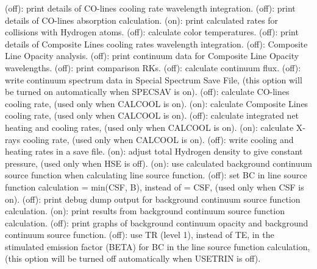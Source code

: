 \space \vbox { (off): \bang
print details of CO-lines cooling rate wavelength integration.}
\space \vbox { (off): \bang
print details of CO-lines absorption calculation.}
\space \vbox { (on): \bang
print calculated rates for collisions with Hydrogen atoms.}
\space \vbox { (off): \bang
calculate color temperatures.}
\space \vbox { (off): \bang
print details of Composite Lines cooling rates wavelength integration.}
\space \vbox { (off): \bang
Composite Line Opacity analysis.}
\space \vbox { (off): \bang
print continuum data for Composite Line Opacity wavelengths.}
\space \vbox { (off): \bang
print comparison RKs.}
\space \vbox { (off): \bang
calculate continuum flux.}
\space \vbox { (off): \bang 
write continuum spectrum data in Special Spectrum Save File,
(this option will be turned on automatically when SPECSAV is on).}
\space \vbox { (off): \bang
calculate CO-lines cooling rate, (used only when CALCOOL is on).}
\space \vbox { (on): \bang
calculate Composite Lines cooling rate, (used only when CALCOOL is on).}
\space \vbox { (off): \bang
calculate integrated net heating and cooling rates, (used only when
CALCOOL is on).}
\space \vbox { (on): \bang
calculate X-rays cooling rate, (used only when CALCOOL is on).}
\space \vbox { (off): \bang
write cooling and heating rates in a save file.}
\space \vbox { (on): \bang
adjust total Hydrogen density to give constant pressure, (used only when
HSE is off).}
\space \vbox { (on): \bang
use calculated background continuum source function when calculating line
source function.}
\space \vbox { (off): \bang
set BC in line source function calculation = min(CSF, B), instead of = CSF,
(used only when CSF is on).}
\space \vbox { (off): \bang
print debug dump output for background continuum source function calculation.}
\space \vbox { (on): \bang
print results from background continuum source function calculation.}
\space \vbox { (off): \bang
print graphs of background continuum opacity and background continuum source
function.}
\space \vbox { (off): \bang
use TR (level 1), instead of TE, in the stimulated emission factor (BETA) for BC in the
line source function calculation, (this option  will be turned off automatically
when USETRIN is off).}
